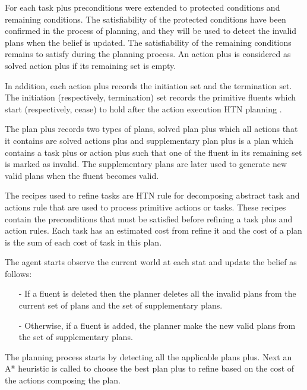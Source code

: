 For each task plus preconditions were extended to protected conditions and remaining conditions. The satisfiability of the protected conditions have been confirmed in the process of planning, and they will be used to detect the invalid plans when the belief is updated. The satisfiability of the remaining conditions remains to satisfy during the planning process. An action plus is considered as solved action plus if its remaining set is empty. 

In addition, each action plus records the initiation set and the termination set. The initiation (respectively, termination) set records the primitive fluents which start (respectively, cease) to hold after the action execution HTN planning \cite{hayashi2006dynagent}. 

The plan plus records two types of plans, solved plan plus which all actions that it contains are solved actions plus and supplementary plan plus is a plan which contains a task plus or action plus such that one of the fluent in its remaining set is marked as invalid. The supplementary plans are later used to generate new valid plans when the fluent becomes valid. 

The recipes used to refine tasks are HTN rule for decomposing abstract task and actions rule that are used to process primitive actions or tasks. These recipes contain the preconditions that must be satisfied before refining a task plus and action rules. Each task has an estimated cost from refine it and the cost of a plan is the sum of each cost of task in this plan.

The agent starts observe the current world at each stat and update the belief as follows:
\begin{itemize}
\item[-]If a fluent is deleted then the planner deletes all the invalid plans from the current set of plans and the set of supplementary plans. 
\item[-]Otherwise, if a fluent is added, the planner make the new valid plans from the set of supplementary plans. 
\end{itemize}


The planning process starts by detecting all the applicable plans plus. Next an A* heuristic is called to choose the best plan plus to refine based on the cost of the actions composing the plan.

